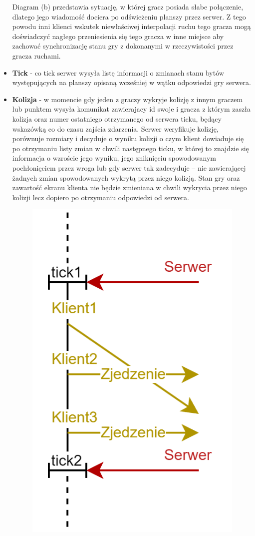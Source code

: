 \documentclass{article}
\begin{document}
\begin{itemize}
Diagram (b) przedstawia sytuację, w której gracz posiada słabe połączenie, dlatego jego wiadomość dociera
po odświeżeniu planszy przez serwer. Z tego powodu inni klienci wskutek niewłaściwej interpolacji ruchu tego gracza mogą doświadczyć nagłego przeniesienia się tego gracza w inne miejsce aby zachować synchronizację stanu gry z dokonanymi w rzeczywistości przez gracza ruchami.

    \item \textbf{Tick} - co tick serwer wysyła listę informacji o zmianach stanu bytów występujących na planszy opisaną wcześniej w wątku odpowiedzi gry serwera.

    \item \textbf{Kolizja} - w momencie gdy jeden z graczy wykryje kolizję z innym graczem lub punktem wysyła komunikat
    zawierajacy id swoje i gracza z którym zaszła kolizja oraz numer ostatniego otrzymanego od serwera ticku, będący wskazówką co do czasu zajścia zdarzenia. Serwer weryfikuje kolizję, porównuje rozmiary i decyduje
    o wyniku kolizji o czym klient dowiaduje się po otrzymaniu listy zmian w chwili następnego ticku, w której to znajdzie się informacja o wzroście jego wyniku, jego zniknięciu spowodowanym pochłonięciem przez wroga lub gdy serwer tak zadecyduje -- nie zawierającej żadnych zmian spowodowanych wykrytą przez niego kolizją. Stan gry oraz zawartość ekranu klienta nie będzie zmieniana w chwili wykrycia przez niego kolizji lecz dopiero po otrzymaniu odpowiedzi od serwera. 
    \begin{figure}[h]
        \centering
        \includegraphics[scale=0.5]{jedzenie.png}

\end{figure}
\end{itemize}
\end{document}
